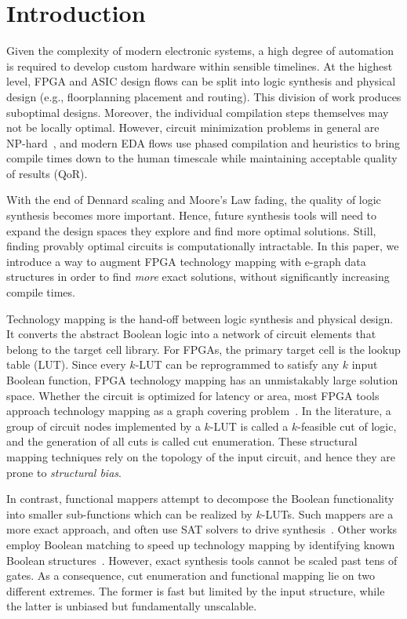 \section{Introduction}\label{sec:intro}
Given the complexity of modern electronic systems, a high degree of automation
is required to develop custom hardware within sensible timelines. At the
highest level, FPGA and ASIC design flows can be split into logic synthesis and
physical design (e.g., floorplanning placement and routing). This division of
work produces suboptimal designs. Moreover, the individual compilation steps
themselves may not be locally optimal. However, circuit minimization problems
in general are NP-hard~\cite{logicmin,twolevellogic}, and modern EDA flows use
phased compilation and heuristics to bring compile times down to the human
timescale while maintaining acceptable quality of results (QoR).

With the end of Dennard scaling and Moore's Law fading, the quality of logic
synthesis becomes more important. Hence, future synthesis tools will need to
expand the design spaces they explore and find more optimal solutions. Still,
finding provably optimal circuits is computationally intractable. In this
paper, we introduce a way to augment FPGA technology mapping with e-graph data
structures in order to find \textit{more} exact solutions, without
significantly increasing compile times.

Technology mapping is the hand-off between logic synthesis and physical design.
It converts the abstract Boolean logic into a network of circuit elements that
belong to the target cell library. For FPGAs, the primary target cell is the
lookup table (LUT). Since every $k$-LUT can be reprogrammed to satisfy any $k$
input Boolean function, FPGA technology mapping has an unmistakably large
solution space. Whether the circuit is optimized for latency or area, most FPGA
tools approach technology mapping as a graph covering problem~\cite{flowmap,
    daomap, attmap, imap}. In the literature, a group of circuit nodes implemented
by a $k$-LUT is called a $k$-feasible cut of logic, and the generation of all
cuts is called cut enumeration. These structural mapping techniques rely on the
topology of the input circuit, and hence they are prone to \textit{structural
    bias}.

In contrast, functional mappers attempt to decompose the Boolean functionality
into smaller sub-functions which can be realized by $k$-LUTs. Such mappers are
a more exact approach, and often use SAT solvers to drive
synthesis~\cite{satmap,satmap2}. Other works employ Boolean matching to speed
up technology mapping by identifying known Boolean
structures~\cite{boolmatch,fastboolmatch}. However, exact synthesis tools
cannot be scaled past tens of gates. As a consequence, cut enumeration and
functional mapping lie on two different extremes. The former is fast but
limited by the input structure, while the latter is unbiased but fundamentally
unscalable.

